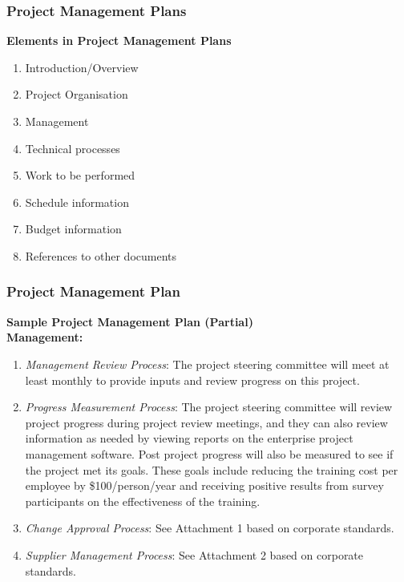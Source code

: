 \documentclass{beamer}
\begin{document}
\begin{frame}
\frametitle{Project Management Plans}
\begin{tcolorbox}
\textbf{Elements in Project Management Plans}
\begin{enumerate}
\item Introduction/Overview
\item Project Organisation
\item Management
\item Technical processes
\item Work to be performed
\item Schedule information
\item Budget information
\item References to other documents
\end{enumerate}
\end{tcolorbox}
\end{frame}

\begin{frame}
\frametitle{Project Management Plan}
\textbf{Sample Project Management Plan (Partial)}\\
\vspace{0.5cm}
\small
\textbf{Management:}
\begin{enumerate}
\item \textit{Management Review Process}: The project steering committee will meet at least monthly to provide inputs and review progress on this project.
\item \textit{Progress Measurement Process}: The project steering committee will review project progress during project review meetings, and they can also review information as needed by viewing reports on the enterprise project management software. Post project progress will also be measured to see if the project met its goals. These goals include reducing the training cost per employee by \$100/person/year and receiving positive results from survey participants on the effectiveness of the training.
\item \textit{Change Approval Process}: See Attachment 1 based on corporate standards.
\item \textit{Supplier Management Process}: See Attachment 2 based on corporate standards.
\end{enumerate}
\end{frame}
\end{document}
